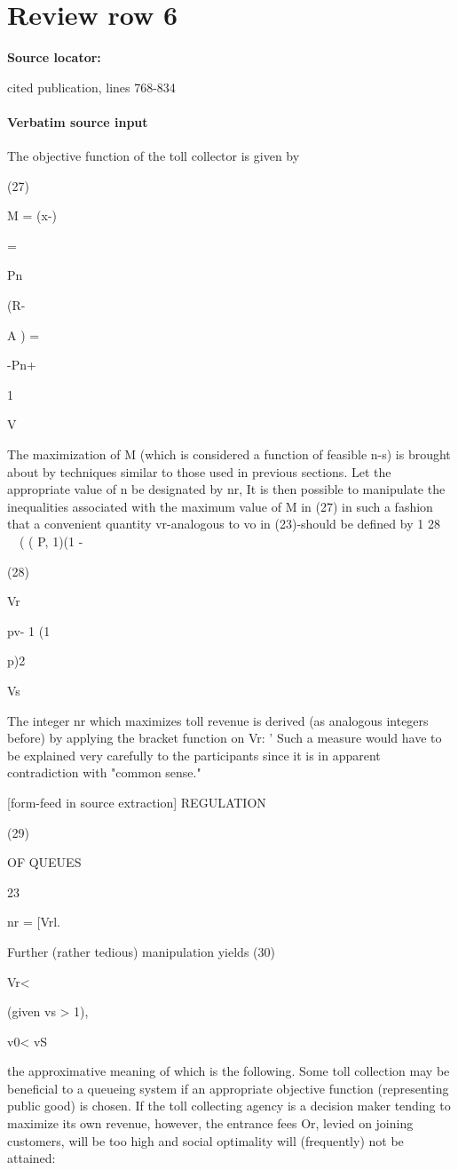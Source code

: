 \documentclass[10pt]{article}
\begin{document}
\section*{Review row 6}
\textbf{Source locator:} {\footnotesize\raggedright cited publication, lines 768-\allowbreak{}834\par}
\paragraph{Verbatim source input}
\begin{ReviewVerbatim}
The objective function of the toll collector is given by

(27)

M = (x-)

=

Pn

(R-

A ) =

-Pn+

1

V

The maximization of M (which is considered a function of feasible n-s) is
brought about by techniques similar to those used in previous sections. Let the
appropriate value of n be designated by nr, It is then possible to manipulate the
inequalities associated with the maximum value of M in (27) in such a fashion that
a convenient quantity vr-analogous to vo in (23)-should be defined by
1
28~ ~~( ( P, 1)(1 -

(28)

Vr

pv- 1 (1

p)2

Vs

The integer nr which maximizes toll revenue is derived (as analogous integers
before) by applying the bracket function on Vr:
' Such a measure would have to be explained very carefully to the participants since it is in apparent
contradiction with "common sense."


[form-feed in source extraction]
REGULATION

(29)

OF QUEUES

23

nr = [Vrl.

Further (rather tedious) manipulation yields
(30)

Vr<

(given vs > 1),

v0< vS

the approximative meaning of which is the following. Some toll collection may be
beneficial to a queueing system if an appropriate objective function (representing
public good) is chosen. If the toll collecting agency is a decision maker tending to
maximize its own revenue, however, the entrance fees Or, levied on joining customers,
will be too high and social optimality will (frequently) not be attained:


\end{ReviewVerbatim}
\end{document}
